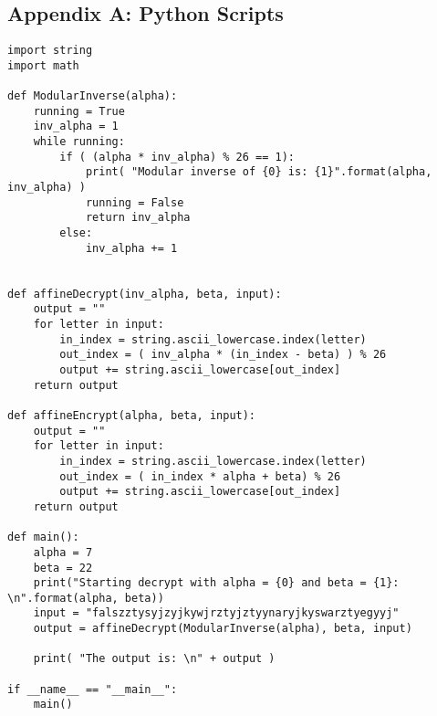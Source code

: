 \documentclass{article}
\begin{document}
\newpage
\subsection*{Appendix A:  Python Scripts}
\begin{minipage}[t]{1.05\textwidth}
\begin{lstlisting}
import string
import math

def ModularInverse(alpha):
	running = True
	inv_alpha = 1
	while running:
		if ( (alpha * inv_alpha) % 26 == 1):
			print( "Modular inverse of {0} is: {1}".format(alpha, inv_alpha) )
			running = False
			return inv_alpha
		else:
			inv_alpha += 1
			

def affineDecrypt(inv_alpha, beta, input):
	output = ""
	for letter in input:
		in_index = string.ascii_lowercase.index(letter)
		out_index = ( inv_alpha * (in_index - beta) ) % 26 
		output += string.ascii_lowercase[out_index]
	return output

def affineEncrypt(alpha, beta, input):
	output = ""
	for letter in input:
		in_index = string.ascii_lowercase.index(letter)
		out_index = ( in_index * alpha + beta) % 26 
		output += string.ascii_lowercase[out_index]
	return output

def main():
	alpha = 7
	beta = 22
	print("Starting decrypt with alpha = {0} and beta = {1}: \n".format(alpha, beta))
	input = "falszztysyjzyjkywjrztyjztyynaryjkyswarztyegyyj"
	output = affineDecrypt(ModularInverse(alpha), beta, input)
	
	print( "The output is: \n" + output )

if __name__ == "__main__":
	main()
\end{lstlisting}
\end{minipage}
\end{document}
